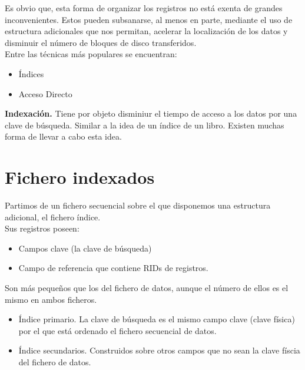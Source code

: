 \documentclass[a4paper,11pt]{article}
\begin{document}
Es obvio que, esta forma de organizar los registros no está exenta de grandes inconvenientes. Estos pueden subsanarse, al menos en parte, mediante el uso de estructura adicionales que nos permitan, acelerar la localización de los datos y disminuir el número de bloques de disco transferidos. \\

Entre las técnicas más populares se encuentran:

\begin{itemize}
\item Índices
\item Acceso Directo
\end{itemize}

\textbf{Indexación.} Tiene por objeto disminiur el tiempo de acceso a los datos por una clave de búsqueda. Similar a la idea de un índice de un libro. Existen muchas forma de llevar a cabo esta idea. \\

\section{Fichero indexados}
Partimos de un fichero secuencial sobre el que disponemos una estructura adicional, el fichero índice. \\

Sus registros poseen:

\begin{itemize}
\item Campos clave (la clave de búsqueda)
\item Campo de referencia que contiene RIDs de registros.
\end{itemize}

Son más pequeños que los del fichero de datos, aunque el número de ellos es el mismo en ambos ficheros.

\begin{itemize}
\item Índice primario. La clave de búsqueda es el mismo campo clave (clave física) por el que está ordenado el fichero secuencial de datos.

\item Índice secundarios. Construidos sobre otros campos que no sean la clave físcia del fichero de datos.
\end{itemize}
\end{document}
